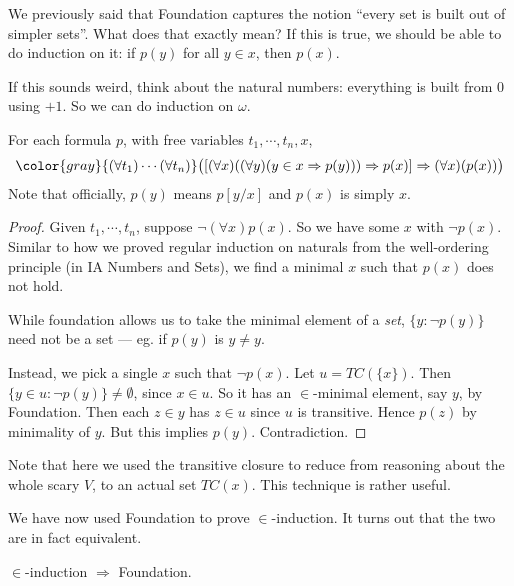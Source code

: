 \documentclass[a4paper]{article}
\begin{document}
We previously said that Foundation captures the notion ``every set is built out of simpler sets''. What does that exactly mean? If this is true, we should be able to do induction on it: if $p(y)$ for all $y\in x$, then $p(x)$.

If this sounds weird, think about the natural numbers: everything is built from $0$ using $+1$. So we can do induction on $\omega$.

\begin{thm}
  For each formula $p$, with free variables $t_1, \cdots, t_n, x$,
  \[
    {\color{gray}{(\forall t_1)\cdots(\forall t_n)}}\big([(\forall x)((\forall y)(y\in x \Rightarrow p(y))) \Rightarrow p(x)] \Rightarrow (\forall x)(p(x))\big)
  \]
  Note that officially, $p(y)$ means $p[y/x]$ and $p(x)$ is simply $x$.
\end{thm}

\begin{proof}
  Given $t_1, \cdots, t_n$, suppose $\neg (\forall x)p(x)$. So we have some $x$ with $\neg p(x)$. Similar to how we proved regular induction on naturals from the well-ordering principle (in IA Numbers and Sets), we find a minimal $x$ such that $p(x)$ does not hold.

  While foundation allows us to take the minimal element of a \emph{set}, $\{y: \neg p(y)\}$ need not be a set --- eg. if $p(y)$ is $y \not= y$.

  Instead, we pick a single $x$ such that $\neg p(x)$. Let $u = TC(\{x\})$. Then $\{y\in u: \neg p(y)\} \not= \emptyset$, since $x\in u$. So it has an $\in$-minimal element, say $y$, by Foundation. Then each $z\in y$ has $z\in u$ since $u$ is transitive. Hence $p(z)$ by minimality of $y$. But this implies $p(y)$. Contradiction.
\end{proof}
Note that here we used the transitive closure to reduce from reasoning about the whole scary $V$, to an actual set $TC(x)$. This technique is rather useful.

We have now used Foundation to prove $\in$-induction. It turns out that the two are in fact equivalent.

\begin{prop}
  $\in$-induction $\Rightarrow $ Foundation.
\end{prop}
\end{document}

